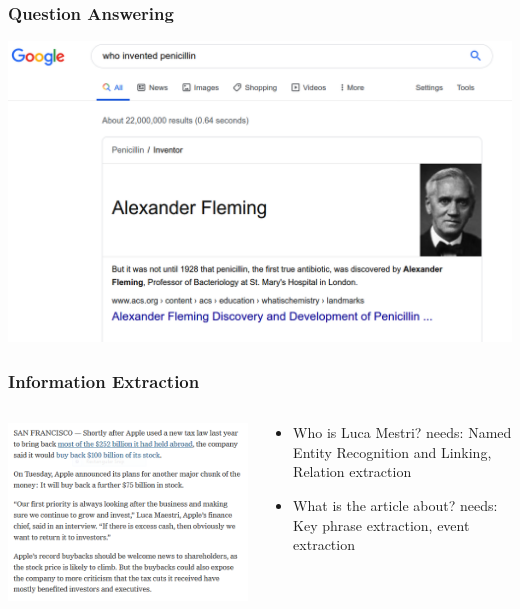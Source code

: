 \documentclass{beamer}
\begin{document}
\begin{frame}
\frametitle{Question Answering}
\includegraphics[width=\textwidth]{figures/qa.png}
\end{frame}

\begin{frame}
\frametitle{Information Extraction}
\begin{columns}
    \begin{column}{0.48\textwidth}
 \includegraphics[width=\textwidth>]{figures/ie1.png}
    \end{column}

    \begin{column}{0.48\textwidth}
\begin{itemize} 
\item Who is Luca Mestri?  
  \pause needs: Named Entity Recognition and Linking, Relation extraction
\item What is the article about?  
   \pause needs: Key phrase extraction, event extraction
\end{itemize}
    \end{column}
\end{columns}
\end{frame}
\end{document}
